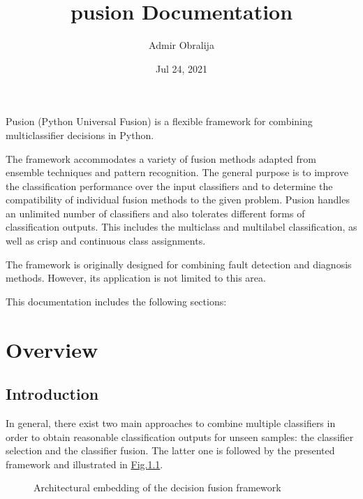 \documentclass[letterpaper,10pt,english]{sphinxmanual}
\title{pusion Documentation}
\date{Jul 24, 2021}
\author{Admir Obralija}
\begin{document}
\pagestyle{empty}
\sphinxmaketitle
\pagestyle{plain}
\sphinxtableofcontents
\pagestyle{normal}
\label{\detokenize{index::doc}}


\sphinxAtStartPar
Pusion (Python Universal Fusion) is a flexible framework for combining multi\sphinxhyphen{}classifier decisions in Python.

\sphinxAtStartPar
The framework accommodates a variety of fusion methods adapted from ensemble techniques and pattern recognition.
The general purpose is to improve the classification performance over the input classifiers and to determine the
compatibility of individual fusion methods to the given problem.
Pusion handles an unlimited number of classifiers and also tolerates different forms of classification outputs.
This includes the multiclass and multilabel classification, as well as crisp and continuous class assignments.

\sphinxAtStartPar
The framework is originally designed for combining fault detection and diagnosis methods.
However, its application is not limited to this area.

\sphinxAtStartPar
This documentation includes the following sections:


\chapter{Overview}
\label{\detokenize{overview:overview}}\label{\detokenize{overview::doc}}

\section{Introduction}
\label{\detokenize{overview:introduction}}
\sphinxAtStartPar
In general, there exist two main approaches to combine multiple classifiers in order to obtain reasonable classification
outputs for unseen samples: the classifier selection and the classifier fusion.
The latter one is followed by the presented framework and illustrated in \hyperref[\detokenize{overview:fig-context}]{Fig.\@ \ref{\detokenize{overview:fig-context}}}.

\begin{figure}[htbp]
\centering
\capstart

\noindent{}
\caption{Architectural embedding of the decision fusion framework}\label{\detokenize{overview:id1}}\label{\detokenize{overview:fig-context}}\end{figure}
\end{document}
